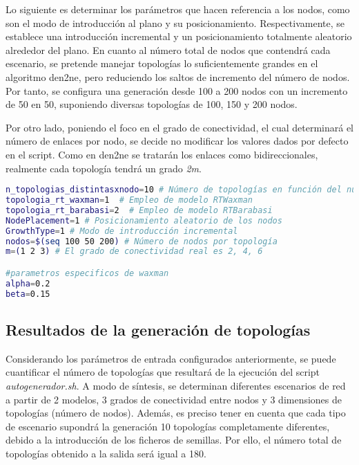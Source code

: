 \vspace{3mm}

Lo siguiente es determinar los parámetros que hacen referencia a los nodos, como son el modo de introducción al plano y su posicionamiento. Respectivamente, se establece una introducción incremental y un posicionamiento totalmente aleatorio alrededor del plano. En cuanto al número total de nodos que contendrá cada escenario, se pretende manejar topologías lo suficientemente grandes en el algoritmo \gls{den2ne}, pero reduciendo los saltos de incremento del número de nodos. Por tanto, se configura una generación desde 100 a 200 nodos con un incremento de 50 en 50, suponiendo diversas topologías de 100, 150 y 200 nodos. 

\vspace{3mm}

Por otro lado, poniendo el foco en el grado de conectividad, el cual determinará el número de enlaces por nodo, se decide no modificar los valores dados por defecto en el script. Como en \gls{den2ne} se tratarán los enlaces como bidireccionales, realmente cada topología tendrá un grado \textit{2m}.

\vspace{3mm}

\begin{lstlisting}[language=bash, style=Consola, caption={Configuración de los parámetros de entrada en el script de automatización}]
n_topologias_distintasxnodo=10 # Número de topologías en función del número de semillas
topologia_rt_waxman=1  # Empleo de modelo RTWaxman
topologia_rt_barabasi=2  # Empleo de modelo RTBarabasi
NodePlacement=1 # Posicionamiento aleatorio de los nodos
GrowthType=1 # Modo de introducción incremental
nodos=$(seq 100 50 200) # Número de nodos por topología
m=(1 2 3) # El grado de conectividad real es 2, 4, 6

#parametros especificos de waxman
alpha=0.2
beta=0.15
\end{lstlisting}

\vspace{3mm}

\subsection{Resultados de la generación de topologías}
\label{sec:gentopo}

Considerando los parámetros de entrada configurados anteriormente, se puede cuantificar el número de topologías que resultará de la ejecución del script \textit{autogenerador.sh}. A modo de síntesis, se determinan diferentes escenarios de red a partir de 2 modelos, 3 grados de conectividad entre nodos y 3 dimensiones de topologías (número de nodos). Además, es preciso tener en cuenta que cada tipo de escenario supondrá la generación 10 topologías completamente diferentes, debido a la introducción de los ficheros de semillas. Por ello, el número total de topologías obtenido a la salida será igual a 180. 

